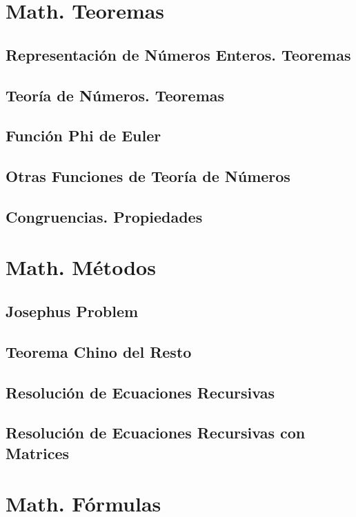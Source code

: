 \section{Math. Teoremas}
	\subsection{Representaci\'on de N\'umeros Enteros. Teoremas}
				
	\subsection{Teor\'ia de N\'umeros. Teoremas}
					
	\subsection{Funci\'on Phi de Euler}
				
	\subsection{Otras Funciones de Teor\'ia de N\'umeros}
		
	\subsection{Congruencias. Propiedades}
		
	
\section{Math. M\'etodos}
	\subsection{Josephus Problem}
		
	\subsection{Teorema Chino del Resto}
		
	\subsection{Resoluci\'on de Ecuaciones Recursivas}
		
	\subsection{Resoluci\'on de Ecuaciones Recursivas con Matrices}
		
	
		
\section{Math. F\'ormulas}
